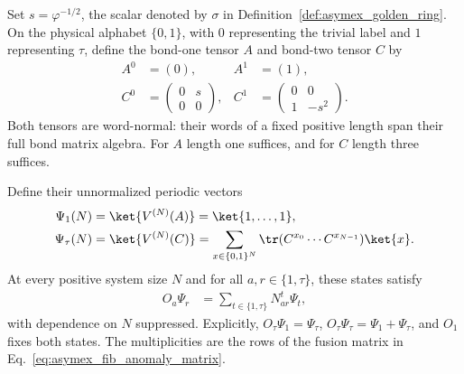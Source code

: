 \begin{lemma}%
    \label{thm:asymex_fib_anomaly_nim_rep}
    \leanok
    Set $s=\varphi^{-1/2}$, the scalar denoted by $\sigma$ in
    Definition~\ref{def:asymex_golden_ring}. On the physical alphabet
    $\{0,1\}$, with $0$ representing the trivial label and $1$
    representing $\tau$, define the bond-one tensor $A$ and bond-two
    tensor $C$ by
    \begin{align}
        A^0 & =(0),                                  & A^1                                       & =(1), \nonumber \\
        C^0 & =\begin{pmatrix}0&s\\0&0\end{pmatrix},
            & C^1                                    & =\begin{pmatrix}0&0\\1&-s^2\end{pmatrix}.
        \label{eq:asymex_fib_anomaly_states}
    \end{align}
    Both tensors are word-normal: their words of a fixed positive
    length span their full bond matrix algebra. For $A$ length one
    suffices, and for $C$ length three suffices.

    Define their unnormalized periodic vectors
    \begin{align}
        \Psi_1(N)    & =\ket{V^{(N)}(A)}
        =\ket{1,\ldots,1}, \nonumber     \\
        \Psi_\tau(N) & =\ket{V^{(N)}(C)}
        =\sum_{x\in\{0,1\}^N}
        \tr(C^{x_0}\cdots C^{x_{N-1}})\ket{x}.
        \label{eq:asymex_fib_anomaly_vectors}
    \end{align}
    At every positive system size $N$ and for all
    $a,r\in\{1,\tau\}$, these states satisfy
    \begin{align}
        O_a\Psi_r & =\sum_{t\in\{1,\tau\}}N_{ar}^t\Psi_t,
        \label{eq:asymex_fib_anomaly_nim_rep}
    \end{align}
    with dependence on $N$ suppressed. Explicitly,
    $O_\tau\Psi_1=\Psi_\tau$,
    $O_\tau\Psi_\tau=\Psi_1+\Psi_\tau$, and $O_1$ fixes both states.
    The multiplicities are the rows of the fusion matrix in
    Eq.~\ref{eq:asymex_fib_anomaly_matrix}.


\end{lemma}
